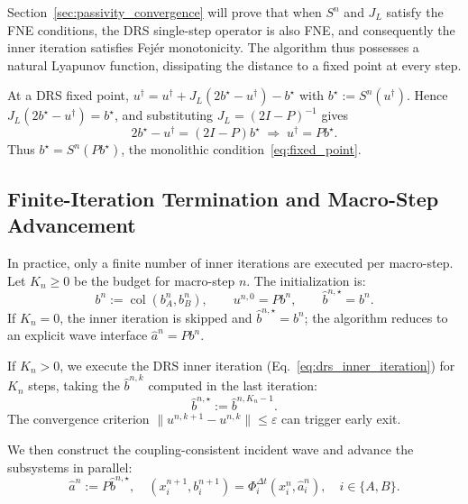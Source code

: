 Section~\ref{sec:passivity_convergence} will prove that when $S^n$ and $J_L$ satisfy the FNE conditions, the DRS single-step operator is also FNE, and consequently the inner iteration satisfies Fejér monotonicity. The algorithm thus possesses a natural Lyapunov function, dissipating the distance to a fixed point at every step.

At a DRS fixed point, $u^\dagger = u^\dagger + J_L(2b^\star - u^\dagger) - b^\star$ with $b^\star := S^n(u^\dagger)$. Hence $J_L(2b^\star - u^\dagger) = b^\star$, and substituting $J_L = (2I-P)^{-1}$ gives
\begin{equation}
2b^\star - u^\dagger = (2I-P)b^\star \;\Longrightarrow\; u^\dagger = Pb^\star.
\label{eq:fixed_point_verification}
\end{equation}
Thus $b^\star = S^n(Pb^\star)$, the monolithic condition~\eqref{eq:fixed_point}.

\subsection{Finite-Iteration Termination and Macro-Step Advancement}
\label{subsec:finite_iteration}

In practice, only a finite number of inner iterations are executed per macro-step. Let $K_n \geq 0$ be the budget for macro-step $n$. The initialization is:
\begin{equation}
b^n := \operatorname{col}(b_A^n, b_B^n), \qquad u^{n,0} = P b^n, \qquad \hat{b}^{n,\star} = b^n.
\label{eq:initialization}
\end{equation}
If $K_n = 0$, the inner iteration is skipped and $\hat{b}^{n,\star} = b^n$; the algorithm reduces to an explicit wave interface $\hat{a}^n = P b^n$.

If $K_n > 0$, we execute the DRS inner iteration (Eq.~\eqref{eq:drs_inner_iteration}) for $K_n$ steps, taking the $\hat{b}^{n,k}$ computed in the last iteration:
\begin{equation}
\hat{b}^{n,\star} := \hat{b}^{n,K_n-1}.
\label{eq:final_response}
\end{equation}
The convergence criterion $\|u^{n,k+1} - u^{n,k}\| \leq \varepsilon$ can trigger early exit.

We then construct the coupling-consistent incident wave and advance the subsystems in parallel:
\begin{equation}
\hat{a}^n := P \hat{b}^{n,\star}, \quad
(x_i^{n+1}, b_i^{n+1}) = \Phi_i^{\Delta t}(x_i^n, \hat{a}_i^n), \quad i \in \{A, B\}.
\label{eq:macro_step_advance}
\end{equation}

